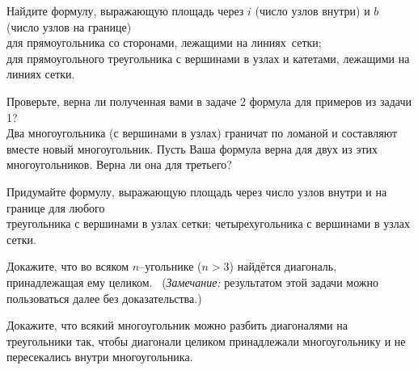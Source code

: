 \documentclass[a4paper,11pt]{article}
\begin{document}
\vspace*{1.3cm}

Найдите формулу,
выражающую площадь через $i$ (число узлов внутри) и $b$ (число узлов на границе)\\
для прямоугольника со сторонами, лежащими на линиях~сетки;\\
для прямоугольного треугольника с вершинами в узлах и катетами, лежащими на
линиях сетки.

 Проверьте, верна ли полученная вами в задаче 2 формула для примеров из задачи 1?\\
 Два многоугольника (с вершинами в узлах) граничат по ломаной
и составляют
вместе новый многоугольник. Пусть Ваша формула верна для %
двух из этих многоугольников. Верна ли она для третьего? %

Придумайте формулу, выражающую площадь через число узлов внутри и на границе для любого\\
 треугольника с вершинами в узлах сетки;
 четырехугольника с вершинами в узлах сетки.







Докажите, что во всяком $n$--угольнике ($n>3$)
найдётся диагональ, принадлежащая ему целиком. \
({\sl Замечание:} результатом этой задачи можно пользоваться далее без
доказательства.)

 Докажите, что всякий многоугольник можно разбить диагоналями
на треугольники так, чтобы диагонали целиком принадлежали
многоугольнику и не пересекались внутри многоугольника.
\end{document}
